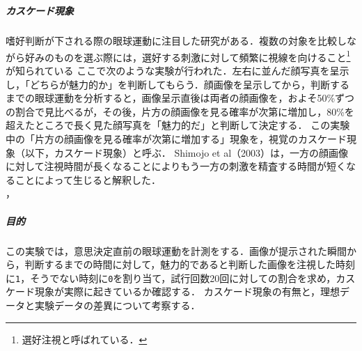 \chapter{\kadaia}
\section{\purpose}
\paragraph{カスケード現象}
嗜好判断が下される際の眼球運動に注目した研究がある．複数の対象を比較しながら好みのものを選ぶ際には，選好する刺激に対して頻繁に視線を向けること\footnote{選好注視と呼ばれている．}が知られている
ここで次のような実験が行われた．左右に並んだ顔写真を呈示し，「どちらが魅力的か」を判断してもらう．顔画像を呈示してから，判断するまでの眼球運動を分析すると，画像呈示直後は両者の顔画像を，およそ50\%ずつの割合で見比べるが，その後，片方の顔画像を見る確率が次第に増加し，80\%を超えたところで長く見た顔写真を「魅力的だ」と判断して決定する．
この実験中の「片方の顔画像を見る確率が次第に増加する」現象を，視覚のカスケード現象（以下，カスケード現象）と呼ぶ．
Shimojo et al（2003）は，一方の顔画像に対して注視時間が長くなることによりもう一方の刺激を精査する時間が短くなることによって生じると解釈した．\\
\hfill\cite[p.202]{美感}，\cite{潜在呈示した情報が選択判断時の視線の動きに与える影響}\par
\paragraph{目的}この実験では，意思決定直前の眼球運動を計測をする．画像が提示された瞬間から，判断するまでの時間に対して，魅力的であると判断した画像を注視した時刻に\texttt{1}，そうでない時刻に\texttt{0}を割り当て，試行回数20回に対しての割合を求め，カスケード現象が実際に起きているか確認する．
カスケード現象の有無と，理想データと実験データの差異について考察する．